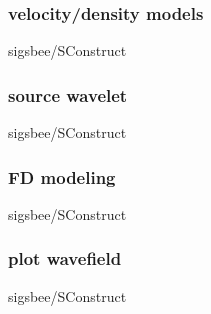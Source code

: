 \begin{frame} \frametitle{velocity/density models}
\normalsize 

		{sigsbee/SConstruct}
\end{frame}
\cwpnote{}
\begin{frame}  \end{frame} \cwpnote{}

\begin{frame} \frametitle{source wavelet}
\normalsize 

		{sigsbee/SConstruct}
\end{frame}
\cwpnote{}
\begin{frame}  \end{frame} \cwpnote{}

\begin{frame} \frametitle{FD modeling}
\normalsize 

		{sigsbee/SConstruct}
\end{frame}
\cwpnote{}

\begin{frame} \frametitle{plot wavefield}
\normalsize 

		{sigsbee/SConstruct}
\end{frame}
\cwpnote{}
\begin{frame}  \end{frame} \cwpnote{}
\begin{frame}  \end{frame} \cwpnote{}
\begin{frame}  \end{frame} \cwpnote{}
\begin{frame}  \end{frame} \cwpnote{}
\begin{frame}  \end{frame} \cwpnote{}
\begin{frame}  \end{frame} \cwpnote{}
\begin{frame}  \end{frame} \cwpnote{}
\begin{frame}  \end{frame} \cwpnote{}
\begin{frame}  \end{frame} \cwpnote{}
\begin{frame}  \end{frame} \cwpnote{}

